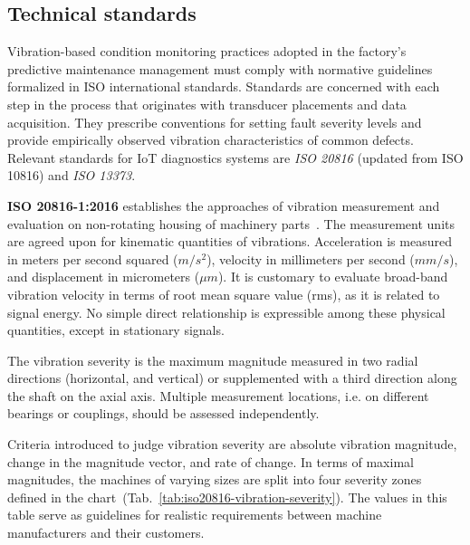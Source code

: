 \subsection{Technical standards} \label{section:technical-standards}
Vibration-based condition monitoring practices adopted in the factory's predictive maintenance management must comply with normative guidelines formalized in ISO international standards. Standards are concerned with each step in the process that originates with transducer placements and data acquisition. They prescribe conventions for setting fault severity levels and provide empirically observed vibration characteristics of common defects. Relevant standards for IoT diagnostics systems are \emph{ISO 20816} (updated from ISO 10816) and \emph{ISO 13373}.
\bigbreak

\textbf{ISO 20816-1:2016} establishes the approaches of vibration measurement and evaluation on non-rotating housing of machinery parts~\cite{noauthor_iso_2016}. The measurement units are agreed upon for kinematic quantities of vibrations. Acceleration is measured in meters per second squared ($m/s^2$), velocity in millimeters per second ($mm/s$), and displacement in micrometers ($\mu m$). It is customary to evaluate broad-band vibration velocity in terms of root mean square value (rms), as it is related to signal energy. No simple direct relationship is expressible among these physical quantities, except in stationary signals.

The vibration severity is the maximum magnitude measured in two radial directions (horizontal, and vertical) or supplemented with a third direction along the shaft on the axial axis. Multiple measurement locations, i.e. on different bearings or couplings, should be assessed independently.

Criteria introduced to judge vibration severity are absolute vibration magnitude, change in the magnitude vector, and rate of change. In terms of maximal magnitudes, the machines of varying sizes are split into four severity zones defined in the chart~(Tab.~\ref{tab:iso20816-vibration-severity}). The values in this table serve as guidelines for realistic requirements between machine manufacturers and their customers.

